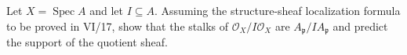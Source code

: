 \begin{problem}
Let $X=\operatorname{Spec}A$ and let $I\subseteq A$. Assuming the structure-sheaf localization formula to be proved in VI/17, show that the stalks of $\mathcal O_X/I\mathcal O_X$ are $A_\mathfrak p/IA_\mathfrak p$ and predict the support of the quotient sheaf.
\end{problem}
